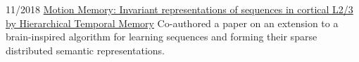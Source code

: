 \documentclass[9pt]{developercv} %
\begin{document}

\begin{entrylist}
	\entry
	  {11/2018}
	  {\href{https://www.sciencedirect.com/science/article/pii/S1877050918323792}{Motion Memory: Invariant representations of sequences in cortical L2/3 by Hierarchical Temporal Memory}}
	  {}
	  {Co-authored a paper on an extension to a brain-inspired algorithm for learning sequences and forming their sparse distributed semantic representations.}
\end{entrylist}

\end{document}
